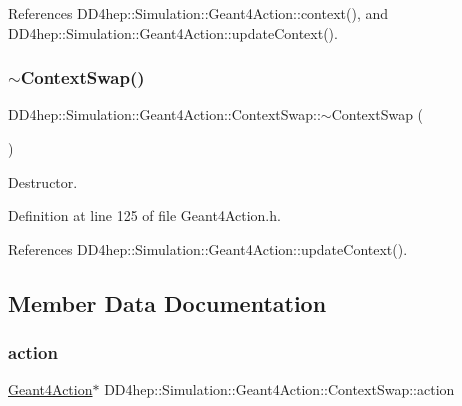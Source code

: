 References D\+D4hep\+::\+Simulation\+::\+Geant4\+Action\+::context(), and D\+D4hep\+::\+Simulation\+::\+Geant4\+Action\+::update\+Context().

\hypertarget{class_d_d4hep_1_1_simulation_1_1_geant4_action_1_1_context_swap_a5f404e4ada6eb6aead85fa78d3f7b233}{}\label{class_d_d4hep_1_1_simulation_1_1_geant4_action_1_1_context_swap_a5f404e4ada6eb6aead85fa78d3f7b233} 
\subsubsection{\texorpdfstring{$\sim$\+Context\+Swap()}{~ContextSwap()}}
{\footnotesize\ttfamily D\+D4hep\+::\+Simulation\+::\+Geant4\+Action\+::\+Context\+Swap\+::$\sim$\+Context\+Swap (\begin{DoxyParamCaption}{ }\end{DoxyParamCaption})\hspace{0.3cm}{\ttfamily [inline]}}



Destructor. 



Definition at line 125 of file Geant4\+Action.\+h.



References D\+D4hep\+::\+Simulation\+::\+Geant4\+Action\+::update\+Context().



\subsection{Member Data Documentation}
\hypertarget{class_d_d4hep_1_1_simulation_1_1_geant4_action_1_1_context_swap_adbbfc954d09ad3d8b807bae2612ef23e}{}\label{class_d_d4hep_1_1_simulation_1_1_geant4_action_1_1_context_swap_adbbfc954d09ad3d8b807bae2612ef23e} 
\subsubsection{\texorpdfstring{action}{action}}
{\footnotesize\ttfamily \hyperlink{class_d_d4hep_1_1_simulation_1_1_geant4_action}{Geant4\+Action}$\ast$ D\+D4hep\+::\+Simulation\+::\+Geant4\+Action\+::\+Context\+Swap\+::action\hspace{0.3cm}{\ttfamily [private]}}



